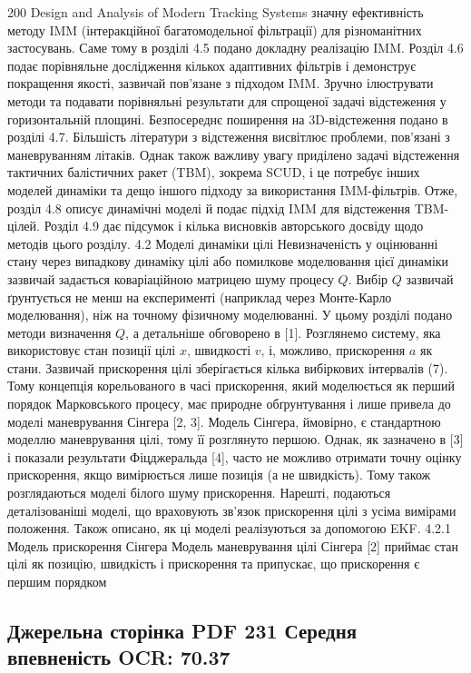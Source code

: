 \documentclass[11pt]{article}
\begin{document}
200 Design and Analysis of Modern Tracking Systems
значну ефективність методу IMM (інтеракційної багатомодельної фільтрації) для
різноманітних застосувань. Саме тому в розділі 4.5 подано докладну реалізацію IMM.
Розділ 4.6 подає порівняльне дослідження кількох адаптивних фільтрів і
демонструє покращення якості, зазвичай пов'язане з підходом IMM.
Зручно ілюструвати методи та подавати порівняльні результати для
спрощеної задачі відстеження у горизонтальній площині. Безпосереднє поширення
на 3D-відстеження подано в розділі 4.7.
Більшість літератури з відстеження висвітлює проблеми, пов'язані з маневруванням
літаків. Однак також важливу увагу приділено задачі відстеження тактичних
балістичних ракет (TBM), зокрема SCUD, і це потребує інших моделей динаміки
та дещо іншого підходу за використання IMM-фільтрів. Отже, розділ 4.8 описує
динамічні моделі й подає підхід IMM для відстеження TBM-цілей. Розділ 4.9 дає
підсумок і кілька висновків авторського досвіду щодо методів цього розділу.
4.2 Моделі динаміки цілі
Невизначеність у оцінюванні стану через випадкову динаміку цілі або помилкове
моделювання цієї динаміки зазвичай задається коваріаційною матрицею шуму процесу
$Q$. Вибір $Q$ зазвичай ґрунтується не менш на експерименті (наприклад через
Монте-Карло моделювання), ніж на точному фізичному моделюванні.
У цьому розділі подано методи визначення $Q$, а детальніше обговорено в [1].
Розглянемо систему, яка використовує стан позиції цілі $x$, швидкості $v$, і, можливо,
прискорення $a$ як стани. Зазвичай прискорення цілі зберігається кілька
вибіркових інтервалів (7). Тому концепція корельованого в часі прискорення,
який моделюється як перший порядок Марковського процесу, має природне обґрунтування і
лише привела до моделі маневрування Сінгера [2, 3].
Модель Сінгера, ймовірно, є стандартною моделлю маневрування цілі,
тому її розглянуто першою. Однак, як зазначено в [3] і показали результати
Фіцджеральда [4], часто не можливо отримати точну оцінку прискорення,
якщо вимірюється лише позиція (а не швидкість). Тому також розглядаються моделі
білого шуму прискорення. Нарешті, подаються деталізованіші моделі, що враховують
зв'язок прискорення цілі з усіма вимірами положення. Також описано,
як ці моделі реалізуються за допомогою EKF.
4.2.1 Модель прискорення Сінгера
Модель маневрування цілі Сінгера [2] приймає стан цілі як позицію,
швидкість і прискорення та припускає, що прискорення є першим порядком
\clearpage\subsection*{Джерельна сторінка PDF 231 \quad Середня впевненість OCR: 70.37}
\end{document}
